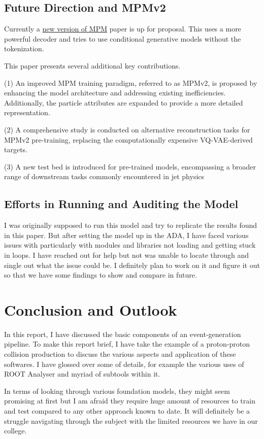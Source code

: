 \documentclass[letterpaper,12pt]{article}
\begin{document}
\subsection{Future Direction and MPMv2}

Currently a \href{https://arxiv.org/pdf/2409.12589}{new version of MPM} paper is up for proposal. This uses a more
powerful decoder and tries to use conditional generative models without the
tokenization.

This paper presents several additional key contributions.

(1) An improved MPM training paradigm, referred to as MPMv2, is proposed by enhancing the model architecture and addressing existing inefficiencies. Additionally, the particle attributes are expanded to provide a more detailed representation.

(2) A comprehensive study is conducted on alternative reconstruction tasks for MPMv2 pre-training, replacing the computationally expensive VQ-VAE-derived targets.

(3) A new test bed is introduced for pre-trained models, encompassing a broader range of downstream tasks commonly encountered in jet physics

\subsection{Efforts in Running and Auditing the Model}

I was originally supposed to run this model and try to replicate the results
found in this paper. But after setting the model up in the ADA, I have faced
various issues with particularly with modules and libraries not loading and getting stuck in
loops. I have reached out for help but not was unable to locate through and
single out what the issue could be. I definitely plan to work on it and figure
it out so that we have some findings to show and compare in future.

\section{Conclusion and Outlook}

In this report, I have discussed the basic components of an event-generation pipeline. To make this report brief, I have take the
example of a proton-proton collision production to discuss the various aspects
and application of these softwares. I have glossed
over some of details, for example the various uses of ROOT Analyser and myriad
of subtools within it.

In terms of looking through various foundation models, they might seem promising at
first but I am afraid they require huge amount of resources to train and test
compared to any other approach known to date. It will definitely be a struggle
navigating through the subject with the limited resources we have in our
college.
\end{document}
